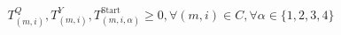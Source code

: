 \documentclass{article}
\begin{document}
\begin{landscape}


%



%

\[
T^Q_{(m,i)}, T^Y_{(m,i)},T^{\text{Start}}_{(m,i,\alpha)} \ge 0, \forall(m,i)\in C, \forall \alpha \in \{1,2,3,4\}
\]






















































\end{landscape}
\end{document}
